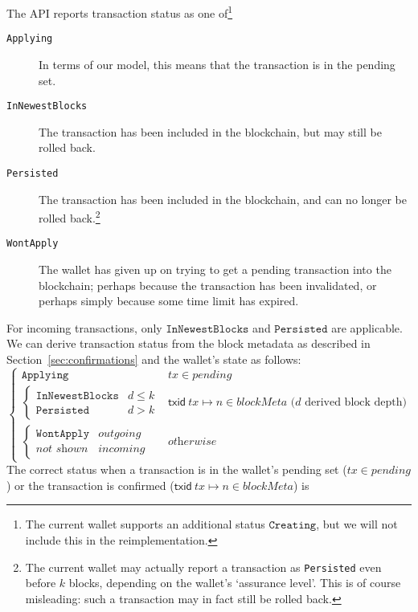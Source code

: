 \documentclass{article}
\numberwithin{equation}{lemma}
\begin{document}
The API reports transaction status as one of\footnote{The current wallet
supports an additional status $\texttt{Creating}$, but we will not include this
in the reimplementation.}
%
\begin{description}
\item[\texttt{Applying}] In terms of our model, this means that the transaction
is in the pending set.
\item[\texttt{InNewestBlocks}] The transaction has been included in the blockchain,
but may still be rolled back.
\item[\texttt{Persisted}] The transaction has been included in the blockchain,
and can no longer be rolled back.\footnote{The current wallet may actually
report a transaction as \texttt{Persisted} even before $k$ blocks, depending on
the wallet's `assurance level'. This is of course misleading: such a transaction
may in fact still be rolled back.}
\item[\texttt{WontApply}] The wallet has given up on trying to get a pending
transaction into the blockchain; perhaps because the transaction has been
invalidated, or perhaps simply because some time limit has expired.
\end{description}
%
For incoming transactions, only $\mathtt{InNewestBlocks}$ and
$\mathtt{Persisted}$ are applicable. We can derive transaction status from
the block metadata as described in Section~\ref{sec:confirmations} and
the wallet's state as follows:
%
\begin{equation*}
\begin{cases}
\texttt{Applying}       & \mathit{tx} \in \mathit{pending} \\
\begin{cases}
\texttt{InNewestBlocks} & d \le k \\
\texttt{Persisted}      & d > k
\end{cases} & \mathsf{txid} ~ \mathit{tx} \mapsto n \in \mathit{blockMeta} \text{ ($d$ derived block depth)} \\
\begin{cases}
\texttt{WontApply} & \textit{outgoing} \\
\textit{not shown} & \textit{incoming}
\end{cases} & \textit{otherwise}
\end{cases}
\end{equation*}
%
The correct status when a transaction is in the wallet's pending set
($\mathit{tx} \in \mathit{pending}$) or the transaction is confirmed
($\mathsf{txid} ~ \mathit{tx} \mapsto n \in \mathit{blockMeta}$) is
\end{document}
